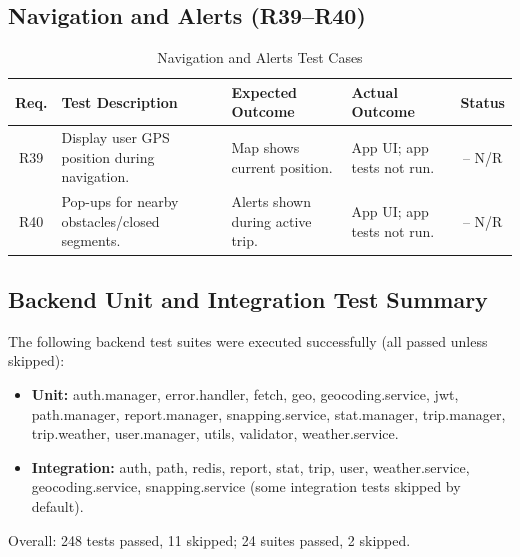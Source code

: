 \subsection{Navigation and Alerts (R39--R40)}
\label{subsec:navigation_alerts_tests}

\begin{table}[H]
    \centering
    \renewcommand{\arraystretch}{1.3}
    \begin{tabular}{|c|p{3.5cm}|p{3.2cm}|p{3.1cm}|c|}
        \hline
        \textbf{Req.} & \textbf{Test Description} & \textbf{Expected Outcome} & \textbf{Actual Outcome} & \textbf{Status} \\
        \hline
        R39 & Display user GPS position during navigation. & Map shows current position. & App UI; app tests not run. & -- N/R \\
        \hline
        R40 & Pop-ups for nearby obstacles/closed segments. & Alerts shown during active trip. & App UI; app tests not run. & -- N/R \\
        \hline
    \end{tabular}
    \caption{Navigation and Alerts Test Cases}
    \label{tab:navigation_requirements}
\end{table}

\subsection{Backend Unit and Integration Test Summary}
\label{subsec:backend_test_summary}

The following backend test suites were executed successfully (all passed unless skipped):
\begin{itemize}
    \item \textbf{Unit:} auth.manager, error.handler, fetch, geo, geocoding.service, jwt, path.manager, report.manager, snapping.service, stat.manager, trip.manager, trip.weather, user.manager, utils, validator, weather.service.
    \item \textbf{Integration:} auth, path, redis, report, stat, trip, user, weather.service, geocoding.service, snapping.service (some integration tests skipped by default).
\end{itemize}
Overall: 248 tests passed, 11 skipped; 24 suites passed, 2 skipped.

